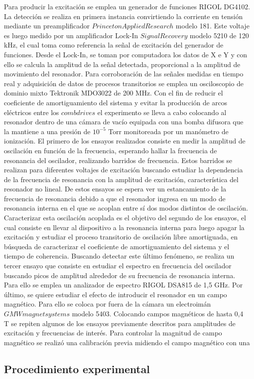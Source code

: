Para producir la excitación se emplea un generador de funciones RIGOL DG4102. La detección se realiza en primera instancia convirtiendo la corriente en tensión mediante un preamplificador $Princeton Applied Research$ modelo 181. Este voltaje es luego medido por un amplificador Lock-In $Signal Recovery$ modelo 5210 de 120 kHz, el cual toma como referencia la señal de excitación del generador de funciones. Desde el Lock-In, se toman por computadora los datos de X e Y y con ello se calcula la amplitud de la señal detectada, proporcional a la amplitud de movimiento del resonador. Para corroboración de las señales medidas en tiempo real y adquisición de datos de procesos transitorios se emplea un osciloscopio de dominio mixto Tektronik MDO3022 de 200 MHz. Con el fin de reducir el coeficiente de amortiguamiento del sistema y evitar la producción de arcos eléctricos entre los $comb drives$ el experimento se lleva a cabo colocando al resonador dentro de una cámara de vacío equipada con una bomba difusora que la mantiene a una presión de $10^{-5}$ Torr monitoreada por un manómetro de ionización.
El primero de los ensayos realizados consiste en medir la amplitud de oscilación en función de la frecuencia,  esperando hallar la frecuencia de resonancia del oscilador, realizando barridos de frecuencia. Estos barridos se realizan para diferentes voltajes de excitación buscando estudiar la dependencia de la frecuencia de resonancia con la amplitud de excitación, característica del resonador no lineal. De estos ensayos se espera ver un estancamiento de la frecuencia de resonancia debido a que el resonador ingresa en un modo de resonancia interna en el que se acoplan entre sí dos modos distintos de oscilación. Caracterizar esta oscilación acoplada es el objetivo del segundo de los ensayos, el cual consiste en llevar al dispositivo a la resonancia interna para luego apagar la excitación y estudiar el proceso transitorio de oscilación libre amortiguada, en búsqueda de caracterizar el coeficiente de amortiguamiento del sistema y el tiempo de coherencia. Buscando detectar este último fenómeno, se realiza un tercer ensayo que consiste en estudiar el espectro en frecuencia del oscilador buscando picos de amplitud alrededor de su frecuencia de resonancia interna. Para ello se emplea un analizador de espectro RIGOL DSA815 de 1,5 GHz. Por último, se quiere estudiar el efecto de introducir el resonador en un campo magnético. Para ello se coloca por fuera de la cámara un electroimán $GMW magnet systems$ modelo 5403. Colocando campos magnéticos de hasta 0,4 T se repiten algunos de los ensayos previamente descritos para amplitudes de excitación y frecuencias de interés. Para controlar la magnitud de campo magnético se realizó una calibración previa midiendo el campo magnético con una   


\subsection{Procedimiento experimental}